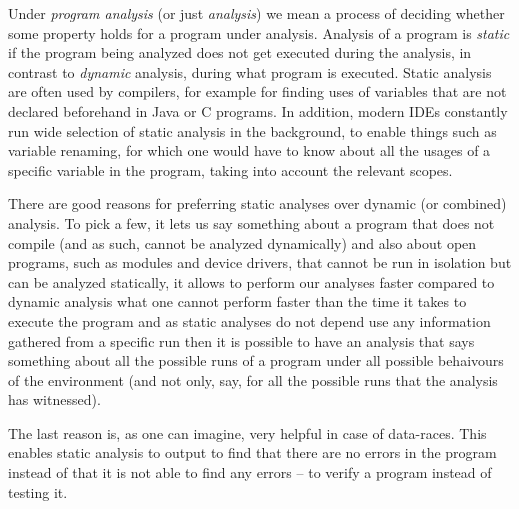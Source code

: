 \documentclass[..thesis.tex]{subfiles}
\begin{document}

Under \textit{program analysis} (or just \textit{analysis}) we mean a process of deciding whether some property holds for a program under analysis.
Analysis of a program is \textit{static} if the program being analyzed does not get executed during the analysis, in contrast to \textit{dynamic} analysis,
during what program is executed. Static analysis are often used by compilers, for example for finding uses of variables that are not declared beforehand
in Java or C programs. In addition, modern IDEs constantly run wide selection of static analysis in the background, to enable things such as variable renaming,
for which one would have to know about all the usages of a specific variable in the program, taking into account the relevant scopes. 



There are good reasons for preferring static analyses over dynamic (or combined) analysis.
To pick a few, it lets us say something about a program that does not compile (and as such, cannot be analyzed dynamically) and also about open programs,
such as modules and device drivers, that cannot be run in isolation but can be analyzed statically,  
it allows to perform our analyses faster compared to dynamic analysis what one cannot perform faster than the time it takes to execute the program
and as static analyses do not depend use any information gathered from a specific run then it is possible to have an analysis that says something
about all the possible runs of a program under all possible behaivours of the environment (and not only, say, for all the possible runs that the analysis has witnessed).

The last reason is, as one can imagine, very helpful in case of data-races. This enables static analysis to output to find that there
 are no errors in the program instead of that it is not able to find any errors -- to verify a program instead of testing it.


\end{document}
